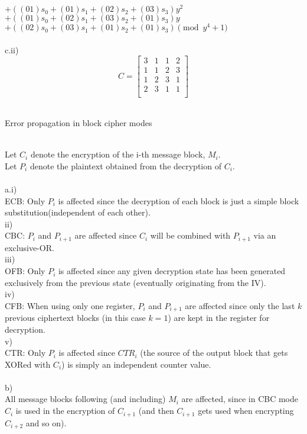 \documentclass{assignment}
\begin{document}
\begin{problemlist}
\begin{problem}
\begin{answer}
$+((01)s_0+(01)s_1+(02)s_2+(03)s_3)y^2$\\
$+((01)s_0+(02)s_1+(03)s_2+(01)s_3)y$\\
$+((02)s_0+(03)s_1+(01)s_2+(01)s_3) \pmod {y^4+1}$\\
\\
c.ii)\\
\[
C=
\begin{bmatrix}
3 & 1 & 1 & 2 \\
1 & 1 & 2 & 3\\
1 & 2 & 3 & 1\\
2 & 3 & 1 & 1\\
\end{bmatrix}
\]
\\
\end{answer}
\end{problem}

\pbitem Error propagation in block cipher modes
\begin{problem}
\begin{answer}
\\
Let $C_i$ denote the encryption of the i-th message block, $M_i$.\\
Let $P_i$ denote the plaintext obtained from the decryption of $C_i$.\\
\\
a.i)\\
ECB: Only $P_i$ is affected since the decryption of each block is just a simple block substitution(independent of each other).\\
ii)\\
CBC: $P_i$ and $P_{i+1}$ are affected since $C_i$ will be combined with $P_{i+1}$ via an exclusive-OR.\\
iii)\\
OFB: Only $P_i$ is affected since any given decryption state has been generated exclusively from the previous state (eventually originating from the IV).\\
iv)\\
CFB: When using only one register, $P_i$ and $P_{i+1}$ are affected since only the last $k$ previous ciphertext blocks (in this case $k=1$) are kept in the register for decryption. \\
v)\\
CTR: Only $P_i$ is affected since $CTR_i$ (the source of the output block that gets XORed with $C_i$) is simply an independent counter value.\\
\\
b)\\
All message blocks following (and including) $M_i$ are affected, since in CBC mode $C_i$ is used in the encryption of $C_{i+1}$ (and then $C_{i+1}$ gets used when encrypting $C_{i+2}$ and so on).\\
\\
\end{answer}
\end{problem}

\end{problemlist}
\end{document}
